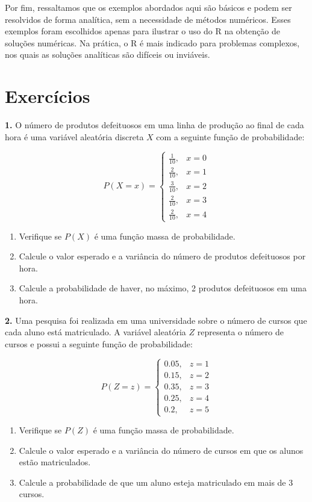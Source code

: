\documentclass[
]{book}
\begin{document}
Por fim, ressaltamos que os exemplos abordados aqui são básicos e podem ser resolvidos de forma analítica, sem a necessidade de métodos numéricos. Esses exemplos foram escolhidos apenas para ilustrar o uso do R na obtenção de soluções numéricas. Na prática, o R é mais indicado para problemas complexos, nos quais as soluções analíticas são difíceis ou inviáveis.

\section{Exercícios}\label{exercuxedcios-21}

\textbf{1.} O número de produtos defeituosos em uma linha de produção ao final de cada hora é uma variável aleatória discreta \(X\) com a seguinte função de probabilidade:

\[P(X = x) =
\begin{cases}
\frac{1}{10}, & x = 0 \\
\frac{2}{10}, & x = 1 \\
\frac{3}{10}, & x = 2 \\
\frac{2}{10}, & x = 3 \\
\frac{2}{10}, & x = 4
\end{cases}\]

\begin{enumerate}
\def\labelenumi{(\alph{enumi})}
\item
  Verifique se \(P(X)\) é uma função massa de probabilidade.
\item
  Calcule o valor esperado e a variância do número de produtos defeituosos por hora.
\item
  Calcule a probabilidade de haver, no máximo, 2 produtos defeituosos em uma hora.
\end{enumerate}

\textbf{2.} Uma pesquisa foi realizada em uma universidade sobre o número de cursos que cada aluno está matriculado. A variável aleatória \(Z\) representa o número de cursos e possui a seguinte função de probabilidade:

\[P(Z = z) =
\begin{cases}
0.05, & z = 1 \\
0.15, & z = 2 \\
0.35, & z = 3 \\
0.25, & z = 4 \\
0.2, & z = 5
\end{cases}\]

\begin{enumerate}
\def\labelenumi{(\alph{enumi})}
\item
  Verifique se \(P(Z)\) é uma função massa de probabilidade.
\item
  Calcule o valor esperado e a variância do número de cursos em que os alunos estão matriculados.
\item
  Calcule a probabilidade de que um aluno esteja matriculado em mais de 3 cursos.
\end{enumerate}
\end{document}
